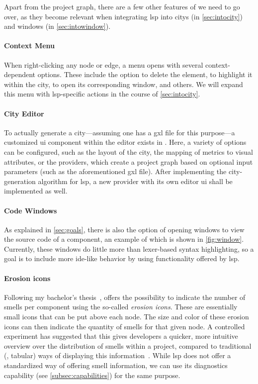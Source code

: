 \documentclass[../thesis]{subfiles}
\begin{document}
Apart from the project graph, there are a few other features of \SEE{} we need to go over, as they become relevant when integrating \gls{lsp} into \glspl{city} (in \cref{sec:intocity}) and \glspl{window} (in \cref{sec:intowindow}).

\paragraph{Context Menu}
When right-clicking any node or edge, a menu opens with several context-dependent options.
These include the option to delete the element, to highlight it within the \gls{city}, to open its corresponding \gls{window}, and others.
We will expand this menu with \gls{lsp}-specific actions in the course of \cref{sec:intocity}.

\paragraph{City Editor}
To actually generate a \gls{city}---assuming one has a \gls{gxl} file for this purpose---a customized \gls{ui} component within the \gls{editor} exists in \SEE{}. 
Here, a variety of options can be configured, such as the layout of the city, the mapping of metrics to visual attributes, or the \glspl*{provider}, which create a project graph based on optional input parameters (such as the aforementioned \gls{gxl} file).
After implementing the city-generation algorithm for \gls{lsp}, a new \gls{provider} with its own \gls{editor} \gls{ui} shall be implemented as well.

\paragraph{Code Windows}
As explained in \cref{sec:goals}, there is also the option of opening \glspl{window} to view the source code of a component, an example of which is shown in \cref{fig:window}.
Currently, these windows do little more than lexer-based syntax highlighting, so a goal is to include more \gls{ide}-like behavior by using functionality offered by \gls{lsp}.

\paragraph{Erosion icons}
Following my bachelor's thesis~\cite{galperin2021}, \SEE{} offers the possibility to indicate the number of \glspl{smell} per component using the so-called \emph{erosion icons}.
These are essentially small icons that can be put above each node.
The size and color of these erosion icons can then indicate the quantity of \glspl{smell} for that given node.
A controlled experiment has suggested that this gives developers a quicker, more intuitive overview over the distribution of \glspl{smell} within a project, compared to traditional (\ie, tabular) ways of displaying this information~\cite{galperin2022}.
While \gls{lsp} does not offer a standardized way of offering \gls{smell} information, we can use its diagnostics capability (see \cref{subsec:capabilities}) for the same purpose.
\end{document}
